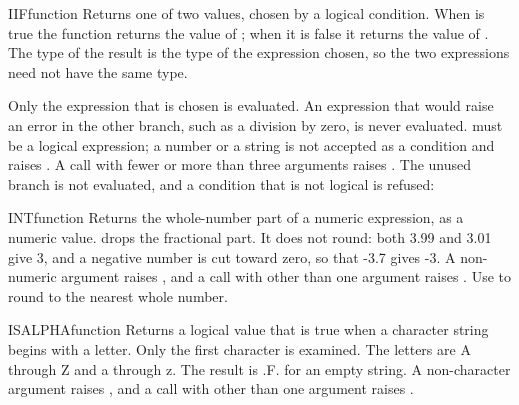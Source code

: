 \begin{XbaseEntry}{IIF}{function}
Returns one of two values, chosen by a logical condition.
\Syntax
{}
\Usage
When  is true the function returns the value of ; when it is false it returns the value of . The type of the result is the type of the expression chosen, so the two expressions need not have the same type.

Only the expression that is chosen is evaluated. An expression that would raise an error in the other branch, such as a division by zero, is never evaluated.  must be a logical expression; a number or a string is not accepted as a condition and raises . A call with fewer or more than three arguments raises .
\Examples
{}
The unused branch is not evaluated, and a condition that is not logical is refused:
\end{XbaseEntry}

\begin{XbaseEntry}{INT}{function}
Returns the whole-number part of a numeric expression, as a numeric value.
\Syntax
{}
\Usage
{} drops the fractional part. It does not round: both 3.99 and 3.01 give 3, and a negative number is cut toward zero, so that -3.7 gives -3. A non-numeric argument raises , and a call with other than one argument raises .
\Tips
Use  to round to the nearest whole number.
\Examples
{}
\end{XbaseEntry}

\begin{XbaseEntry}{ISALPHA}{function}
Returns a logical value that is true when a character string begins with a letter.
\Syntax
{}
\Usage
Only the first character is examined. The letters are A through Z and a through z. The result is .F. for an empty string. A non-character argument raises , and a call with other than one argument raises .
\Examples
{}
\end{XbaseEntry}

